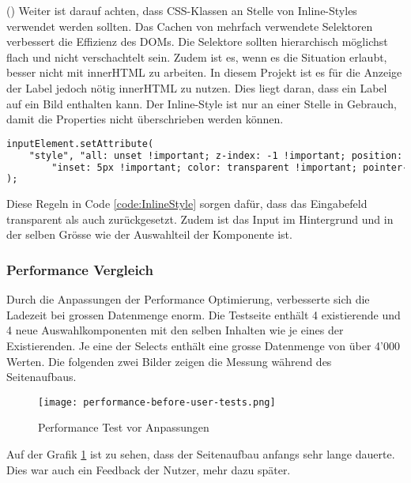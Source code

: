 (\cite{efficientDomManipulation}) Weiter ist darauf achten, dass CSS-Klassen an Stelle von Inline-Styles verwendet werden sollten.
Das Cachen von mehrfach verwendete Selektoren verbessert die Effizienz des DOMs.
Die Selektore sollten hierarchisch möglichst flach und nicht verschachtelt sein.
Zudem ist es, wenn es die Situation erlaubt, besser nicht mit innerHTML zu arbeiten.
In diesem Projekt ist es für die Anzeige der Label jedoch nötig innerHTML zu nutzen.
Dies liegt daran, dass ein Label auf ein Bild enthalten kann.
Der Inline-Style ist nur an einer Stelle in Gebrauch, damit die Properties nicht überschrieben werden können.

\begin{lstlisting}[language = html, caption = Code: Inline-Style für Inputfeld, label = code:InlineStyle]
inputElement.setAttribute(
    "style", "all: unset !important; z-index: -1 !important; position: absolute !important;" +
        "inset: 5px !important; color: transparent !important; pointer-events: none !important;"
);
\end{lstlisting}

Diese Regeln in Code \ref{code:InlineStyle} sorgen dafür, dass das Eingabefeld transparent als auch zurückgesetzt.
Zudem ist das Input im Hintergrund und in der selben Grösse wie der Auswahlteil der Komponente ist.

\subsubsection{Performance Vergleich}

Durch die Anpassungen der Performance Optimierung, verbesserte sich die Ladezeit bei grossen Datenmenge enorm.
Die Testseite enthält 4 existierende und 4 neue Auswahlkomponenten mit den selben Inhalten wie je eines der Existierenden.
Je eine der Selects enthält eine grosse Datenmenge von über 4'000 Werten.
Die folgenden zwei Bilder zeigen die Messung während des Seitenaufbaus.

\begin{figure}[!htb]
    \centering
    \texttt{[image: performance-before-user-tests.png]}
    \caption{Performance Test vor Anpassungen}
    \label{Abbildung:PerformanceTestBefore}
\end{figure}

Auf der Grafik \ref{Abbildung:PerformanceTestBefore} ist zu sehen, dass der Seitenaufbau anfangs sehr lange dauerte.
Dies war auch ein Feedback der Nutzer, mehr dazu später.

